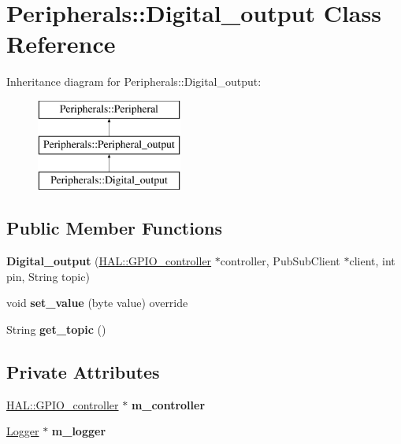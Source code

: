 \hypertarget{class_peripherals_1_1_digital__output}{}\section{Peripherals\+:\+:Digital\+\_\+output Class Reference}
\label{class_peripherals_1_1_digital__output}
Inheritance diagram for Peripherals\+:\+:Digital\+\_\+output\+:\begin{figure}[H]
\begin{center}
\leavevmode
\includegraphics[height=3.000000cm]{class_peripherals_1_1_digital__output}
\end{center}
\end{figure}
\subsection*{Public Member Functions}
\begin{DoxyCompactItemize}
\item 
\mbox{\label{class_peripherals_1_1_digital__output_ab11fff2506cd7c25bf6b0158c6d8c183}} 
{\bfseries Digital\+\_\+output} (\hyperlink{class_h_a_l_1_1_g_p_i_o__controller}{H\+A\+L\+::\+G\+P\+I\+O\+\_\+controller} $\ast$controller, Pub\+Sub\+Client $\ast$client, int pin, String topic)
\item 
\mbox{\label{class_peripherals_1_1_digital__output_a7fb9ec598c9abda4b963d2f9390eb735}} 
void {\bfseries set\+\_\+value} (byte value) override
\item 
\mbox{\label{class_peripherals_1_1_digital__output_a22de69a613aff4933bd64d97f81a30ed}} 
String {\bfseries get\+\_\+topic} ()
\end{DoxyCompactItemize}
\subsection*{Private Attributes}
\begin{DoxyCompactItemize}
\item 
\mbox{\label{class_peripherals_1_1_digital__output_a39dbbc2c9a78bc0099fb5adac890aae0}} 
\hyperlink{class_h_a_l_1_1_g_p_i_o__controller}{H\+A\+L\+::\+G\+P\+I\+O\+\_\+controller} $\ast$ {\bfseries m\+\_\+controller}
\item 
\mbox{\label{class_peripherals_1_1_digital__output_ac0ef56e150c45503d7330ea14764bb7a}} 
\hyperlink{class_logger}{Logger} $\ast$ {\bfseries m\+\_\+logger}
\end{DoxyCompactItemize}

